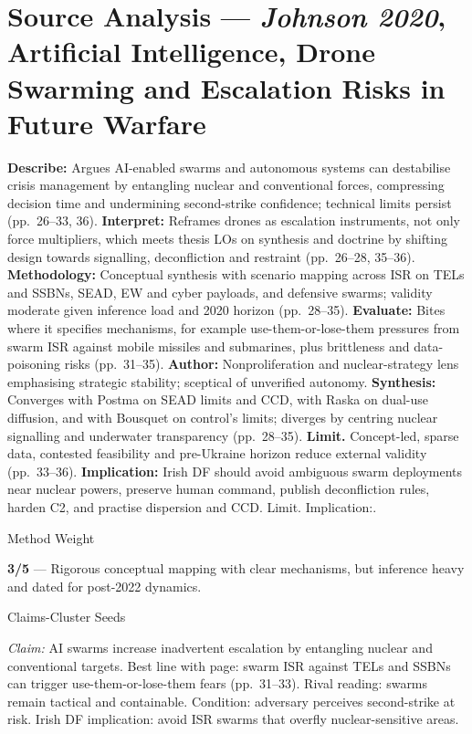 \section*{Source Analysis — \textit{Johnson 2020}, Artificial Intelligence, Drone Swarming and Escalation Risks in Future Warfare}
\textbf{Describe:} Argues AI-enabled swarms and autonomous systems can destabilise crisis management by entangling nuclear and conventional forces, compressing decision time and undermining second-strike confidence; technical limits persist (pp.~26–33, 36).
\textbf{Interpret:} Reframes drones as escalation instruments, not only force multipliers, which meets thesis LOs on synthesis and doctrine by shifting design towards signalling, deconfliction and restraint (pp.~26–28, 35–36).
\textbf{Methodology:} Conceptual synthesis with scenario mapping across ISR on TELs and SSBNs, SEAD, EW and cyber payloads, and defensive swarms; validity moderate given inference load and 2020 horizon (pp.~28–35).
\textbf{Evaluate:} Bites where it specifies mechanisms, for example use-them-or-lose-them pressures from swarm ISR against mobile missiles and submarines, plus brittleness and data-poisoning risks (pp.~31–35).
\textbf{Author:} Nonproliferation and nuclear-strategy lens emphasising strategic stability; sceptical of unverified autonomy.
\textbf{Synthesis:} Converges with Postma on SEAD limits and CCD, with Raska on dual-use diffusion, and with Bousquet on control’s limits; diverges by centring nuclear signalling and underwater transparency (pp.~28–35).
\textbf{Limit.} Concept-led, sparse data, contested feasibility and pre-Ukraine horizon reduce external validity (pp.~33–36).
\textbf{Implication:} Irish DF should avoid ambiguous swarm deployments near nuclear powers, preserve human command, publish deconfliction rules, harden C2, and practise dispersion and CCD. Limit. Implication:.

Method Weight

\textbf{3/5} — Rigorous conceptual mapping with clear mechanisms, but inference heavy and dated for post-2022 dynamics.

Claims-Cluster Seeds

\textit{Claim:} AI swarms increase inadvertent escalation by entangling nuclear and conventional targets.
Best line with page: swarm ISR against TELs and SSBNs can trigger use-them-or-lose-them fears (pp.~31–33). Rival reading: swarms remain tactical and containable. Condition: adversary perceives second-strike at risk. Irish DF implication: avoid ISR swarms that overfly nuclear-sensitive areas.


